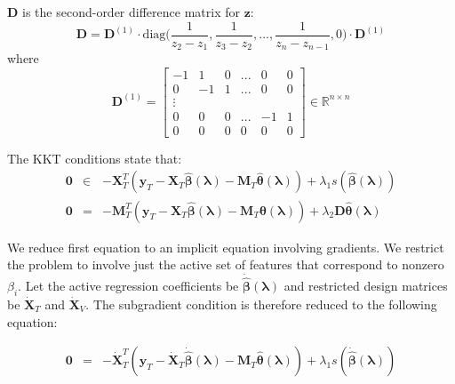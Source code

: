 \documentclass[10pt,letterpaper]{article}
\begin{document}
$\boldsymbol{D}$ is the second-order difference matrix for $\boldsymbol{z}$:
\begin{equation}
\boldsymbol{D} = \boldsymbol{D}^{(1)} \cdot
\text{diag} \big ( \frac{1}{z_{2} - z_1}, \frac{1}{z_{3} - z_2}, ... , \frac{1}{z_{n} - z_{n-1}}, 0 \big )
\cdot \boldsymbol{D}^{(1)}
\end{equation}
where
\begin{equation}
\boldsymbol{D}^{(1)} = 
\begin{bmatrix}
-1 & 1 & 0 & ... & 0 & 0 \\
0 & -1 & 1 & ... & 0 & 0 \\
\vdots \\
0 & 0 & 0 & ... & -1 & 1 \\
0 &0 & 0 &  0  &  0 & 0
\end{bmatrix}
\in
\mathbb{R}^{n\times n}
\end{equation}

The KKT conditions state that:
\begin{equation}
\begin{array}{lcl}
\boldsymbol{0} &\in&
-\boldsymbol{X}_T^T(\boldsymbol{y}_T -
\boldsymbol{X}_T \hat{\boldsymbol{\beta}}(\boldsymbol{\lambda}) - \boldsymbol{M}_T \hat{\boldsymbol{\theta}}(\boldsymbol{\lambda}))
+ \lambda_1 s(\hat{\boldsymbol{\beta}}(\boldsymbol{\lambda})) \\
\boldsymbol{0} &=&
-\boldsymbol{M}_T^T(\boldsymbol{y}_T
- \boldsymbol{X}_T \hat{\boldsymbol{\beta}}(\boldsymbol{\lambda})
- \boldsymbol{M}_T \boldsymbol{\theta}(\boldsymbol{\lambda}))
+ \lambda_2 \boldsymbol{D} \hat{\boldsymbol{\theta}}(\boldsymbol{\lambda})
\end{array}
\end{equation}

We reduce first equation to an implicit equation involving gradients. We restrict the problem to involve just the active set of features that correspond to nonzero $\beta_i$. Let the active regression coefficients be $\dot{\hat{\boldsymbol{\beta}}}(\boldsymbol{\lambda})$ and restricted design matrices be $\dot{\boldsymbol{X}}_T$ and $\dot{\boldsymbol{X}}_V$. The subgradient condition is therefore reduced to the following equation:

\begin{equation}
\begin{array}{lcl}
\boldsymbol{0} &=&
-\dot{\boldsymbol{X}}_T^T(\boldsymbol{y}_T
- \dot{\boldsymbol{X}}_T \dot{\hat{\boldsymbol{\beta}}}(\boldsymbol{\lambda})
- \boldsymbol{M}_T \hat{\boldsymbol{\theta}}(\boldsymbol{\lambda}))
+ \lambda_1 s(\dot{\hat{\boldsymbol{\beta}}}(\boldsymbol{\lambda}))
\end{array}
\end{equation}
\end{document}
